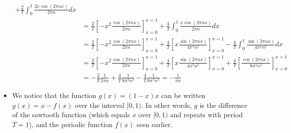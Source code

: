 \documentclass[11pt]{article}
\begin{document}
\begin{solution}
\begin{itemize}
\begin{align*}
            +
            \frac{2}{T}
            \int_{0}^{1} \frac{ 2x \cos(2\pi n x) }{ 2\pi n } dx
            \\&
            =
            \frac{2}{T}
            \left[- x^2 \frac{ \cos(2\pi n x) }{ 2\pi n } \right]_{x=0}^{x=1}
            +
            \frac{4}{T}
            \int_{0}^{1} \frac{ x \cos(2\pi n x) }{ 2\pi n } dx
            \\&
            =
            \frac{2}{T}
            \left[ -x^2 \frac{ \cos(2\pi n x) }{ 2\pi n } \right]_{x=0}^{x=1}
            +
            \frac{4}{T}
            \left[ x \frac{ \sin(2\pi n x) }{ 4\pi^2 n^2 } \right]_{x=0}^{x=1}
            -
            \frac{4}{T}
            \int_{0}^{1} \frac{ \sin(2\pi n x) }{ 4\pi^2 n^2 } dx
            \\&
            =
            \frac{2}{T}
            \left[ -x^2 \frac{ \cos(2\pi n x) }{ 2\pi n } \right]_{x=0}^{x=1}
            +
            \frac{4}{T}
            \left[ x \frac{ \sin(2\pi n x) }{ 4\pi^2 n^2 } \right]_{x=0}^{x=1}
            +
            \frac{4}{T}
            \left[ \frac{ \cos(2\pi n x) }{ 8\pi^3 n^3 } \right]_{x=0}^{x=1}
            \\&
            = 
            -\frac{2}{T}\frac{1}{2\pi n} + \frac{4}{T}\frac{1}{8\pi^3n^3} -  \frac{4}{T}\frac{1}{8\pi^3n^3} = -\frac{1}{\pi n}
        \end{align*}
        \item 
        We notice that the function $g(x) = (1-x)x$ can be written $g(x) = x - f(x)$ over the interval $[0,1)$. 
        In other words, $g$ is the difference of the sawtooth function (which equals $x$ over $[0,1)$ and repeats with period $T=1$),
        and the periodic function $f(x)$ seen earlier.
        

\end{itemize}
\end{solution}
\end{document}
